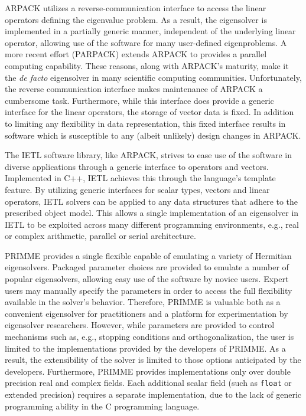 \documentclass[acmtoms,acmnow]{acmtrans2m}
\begin{document}
ARPACK utilizes a reverse-communication interface to access the linear operators defining
the eigenvalue problem. As a result, the eigensolver is implemented in a partially generic
manner, independent of the underlying linear operator, allowing use of the software for
many user-defined eigenproblems. A more recent effort (PARPACK) extends ARPACK to provides
a parallel computing capability. These reasons, along with ARPACK's maturity, make it the
\textit{de facto} eigensolver in many scientific computing communities. Unfortunately, the
reverse communication interface makes maintenance of ARPACK a cumbersome task.
Furthermore, while this interface does provide a generic interface for the linear
operators, the storage of vector data is fixed. In addition to limiting any flexibility in
data representation, this fixed interface results in software which is susceptible to any
(albeit unlikely) design changes in ARPACK.

The IETL software library, like ARPACK, strives to ease use of the software in diverse
applications through a generic interface to operators and vectors. Implemented in C++,
IETL achieves this through the language's template feature. By utilizing generic
interfaces for scalar types, vectors and linear operators, IETL solvers can be applied to
any data structures that adhere to the prescribed object model. This allows a single
implementation of an eigensolver in IETL to be exploited across many different programming
environments, e.g., real or complex arithmetic, parallel or serial architecture.

PRIMME provides a single flexible capable of emulating a variety of Hermitian
eigensolvers. Packaged parameter choices are provided to emulate a number of popular
eigensolvers, allowing easy use of the software by novice users. Expert users may manually
specify the parameters in order to access the full flexibility available in the solver's
behavior. Therefore, PRIMME is valuable both as a convenient eigensolver for practitioners
and a platform for experimentation by eigensolver researchers. However, while parameters
are provided to control mechanisms such as, e.g., stopping conditions and
orthogonalization, the user is limited to the implementations provided by the developers
of PRIMME. As a result, the extensibility of the solver is limited to those options
anticipated by the developers. Furthermore, PRIMME provides implementations only over
double precision real and complex fields. Each additional scalar field (such as
\texttt{float} or extended precision) requires a separate implementation, due to the lack
of generic programming ability in the C programming language.
\end{document}
